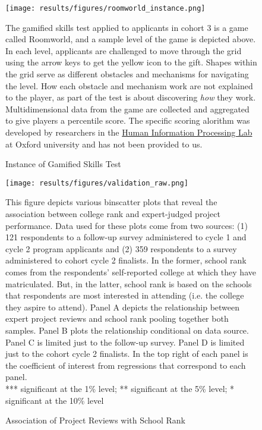     \newpage
    \null
    \vfill
    \begin{figure}[!htb]
    \centering
        \caption{Instance of Gamified Skills Test}\label{fig:roomworld_instance}
    \texttt{[image: results/figures/roomworld\_instance.png]} 
        \begin{notes}
    The gamified skills test applied to applicants in cohort 3 is a game called Roomworld, and a sample level of the game is depicted above. In each level, applicants are challenged to move through the grid using the arrow keys to get the yellow icon to the gift. Shapes within the grid serve as different obstacles and mechanisms for navigating the level. How each obstacle and mechanism work are not explained to the player, as part of the test is about discovering \emph{how} they work. Multidimensional data from the game are collected and aggregated to give players a percentile score. The specific scoring alorithm was developed by researchers in the \hyperlink{https://humaninformationprocessing.com/people/}{Human Information Processing Lab} at Oxford university and has not been provided to us. 
        \end{notes}
    \end{figure}
    \vfill
    
    \newpage
    \begin{figure}[!htb]
    \centering
        \caption{Association of Project Reviews with School Rank} \label{fig:proj_robust_1}
    \texttt{[image: results/figures/validation\_raw.png]} 
        \begin{notes}  
        This figure depicts various binscatter plots that reveal the association between college rank and expert-judged project performance. Data used for these plots come from two sources: (1) 121 respondents to a follow-up survey administered to cycle 1 and cycle 2 program applicants and (2) 359 respondents to a survey administered to cohort cycle 2 finalists. In the former, school rank comes from the respondents' self-reported college at which they have matriculated. But, in the latter, school rank is based on the schools that respondents are most interested in attending (i.e. the college they aspire to attend). Panel A depicts the relationship between expert project reviews and school rank pooling together both samples. Panel B plots the relationship conditional on data source. Panel C is limited just to the follow-up survey. Panel D is limited just to the cohort cycle 2 finalists. In the top right of each panel is the coefficient of interest from regressions that correspond to each panel. \\
        
       *** significant at the 1\% level; ** significant at the 5\% level; * significant at the 10\% level
        \end{notes}
    \end{figure}
    

